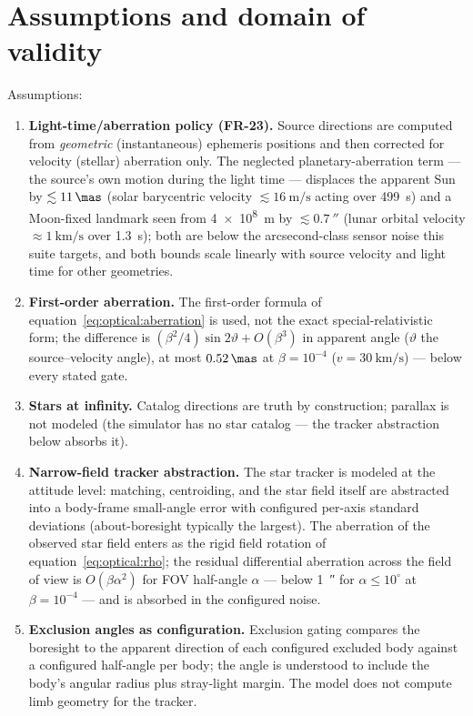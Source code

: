\section{Assumptions and domain of validity}
\label{sec:optical:domain}

Assumptions:
\begin{enumerate}
  \item \textbf{Light-time/aberration policy (FR-23).} Source directions
    are computed from \emph{geometric} (instantaneous) ephemeris
    positions and then corrected for velocity (stellar) aberration only.
    The neglected planetary-aberration term --- the source's own motion
    during the light time --- displaces the apparent Sun by
    $\lesssim \qty{11}{\mas}$ (solar barycentric velocity
    $\lesssim \qty{16}{\metre\per\second}$ acting over
    \qty{499}{\second}) and a Moon-fixed landmark seen from
    \qty{4e8}{\metre} by $\lesssim \qty{0.7}{\arcsecond}$ (lunar orbital
    velocity $\approx \qty{1}{\kilo\metre\per\second}$ over
    \qty{1.3}{\second}); both are below the arcsecond-class sensor noise
    this suite targets, and both bounds scale linearly with source
    velocity and light time for other geometries.
  \item \textbf{First-order aberration.} The first-order formula of
    equation~\eqref{eq:optical:aberration} is used, not the exact
    special-relativistic form; the difference is
    $(\beta^2/4)\sin 2\vartheta + O(\beta^3)$ in apparent angle
    ($\vartheta$ the source--velocity angle), at most
    $\qty{0.52}{\mas}$ at $\beta = 10^{-4}$
    ($v = \qty{30}{\kilo\metre\per\second}$) --- below every stated gate.
  \item \textbf{Stars at infinity.} Catalog directions are truth by
    construction; parallax is not modeled (the simulator has no star
    catalog --- the tracker abstraction below absorbs it).
  \item \textbf{Narrow-field tracker abstraction.} The star tracker is
    modeled at the attitude level: matching, centroiding, and the star
    field itself are abstracted into a body-frame small-angle error with
    configured per-axis standard deviations (about-boresight typically
    the largest). The aberration of the observed star field enters as
    the rigid field rotation of equation~\eqref{eq:optical:rho}; the
    residual differential aberration across the field of view is
    $O(\beta \alpha^2)$ for FOV half-angle $\alpha$ --- below
    \qty{1}{\arcsecond} for $\alpha \le 10^{\circ}$ at
    $\beta = 10^{-4}$ --- and is absorbed in the configured noise.
  \item \textbf{Exclusion angles as configuration.} Exclusion gating
    compares the boresight to the apparent direction of each configured
    excluded body against a configured half-angle per body; the angle is
    understood to include the body's angular radius plus stray-light
    margin. The model does not compute limb geometry for the tracker.
\end{enumerate}

